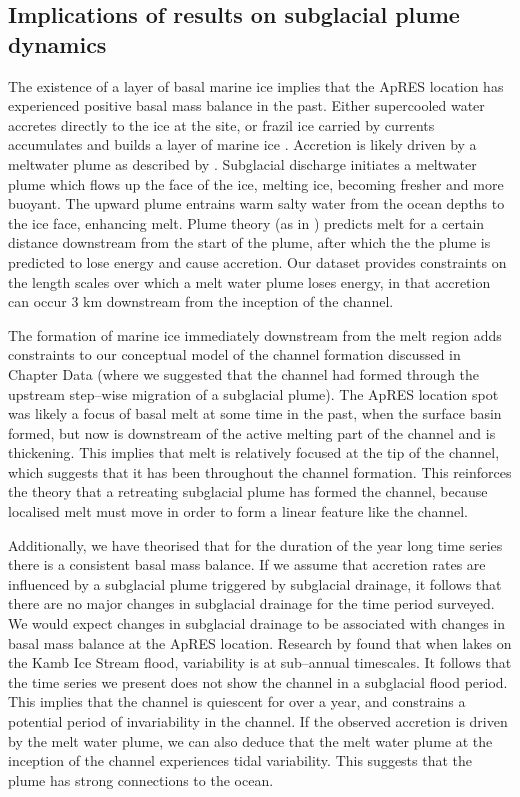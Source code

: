 \subsection{Implications of results on subglacial plume dynamics}
The existence of a layer of basal marine ice implies that the ApRES location has experienced positive basal mass balance in the past. Either supercooled water accretes directly to the ice at the site, or frazil ice carried by currents accumulates and builds a layer of marine ice \citep{vavnkova2021nature}.  Accretion is likely driven by a meltwater plume as described by \cite{hewitt2020subglacial}. Subglacial discharge initiates a meltwater plume which flows up the face of the ice, melting ice, becoming fresher and more buoyant. The upward plume entrains warm salty water from the ocean depths to the ice face, enhancing melt. Plume theory (as in \cite{jenkins2011convection}) predicts melt for a certain distance downstream from the start of the plume, after which the the plume is predicted to lose energy and cause accretion. Our dataset provides constraints on the length scales over which a melt water plume loses energy, in that accretion can occur 3 km downstream from the inception of the channel.

The formation of marine ice immediately downstream from the melt region adds constraints to our conceptual model of the channel formation discussed in Chapter Data (where we suggested that the channel had formed through the upstream step--wise migration of a subglacial plume). The ApRES location spot was likely a focus of basal melt at some time in the past, when the surface basin formed, but now is downstream of the active melting part of the channel and is thickening. This implies that melt is relatively focused at the tip of the channel, which suggests that it has been throughout the channel formation. This reinforces the theory that a retreating subglacial plume has formed the channel, because localised melt must move in order to form a linear feature like the channel.

Additionally, we have theorised that for the duration of the year long time series there is a consistent basal mass balance. If we assume that accretion rates are influenced by a subglacial plume triggered by subglacial drainage, it follows that there are no major changes in subglacial drainage for the time period surveyed. 
We would expect changes in subglacial drainage to be associated with changes in basal mass balance at the ApRES location. 
Research by \cite{kim2016active} found that when lakes on the Kamb Ice Stream flood, variability is at sub--annual timescales.  It follows that the time series we present does not show the channel in a subglacial flood period. This implies that the channel is quiescent for over a year, and constrains a potential period of invariability in the channel.
If the observed accretion is driven by the melt water plume, we can also deduce that the melt water plume at the inception of the channel experiences tidal variability. This suggests that the plume has strong connections to the ocean.


